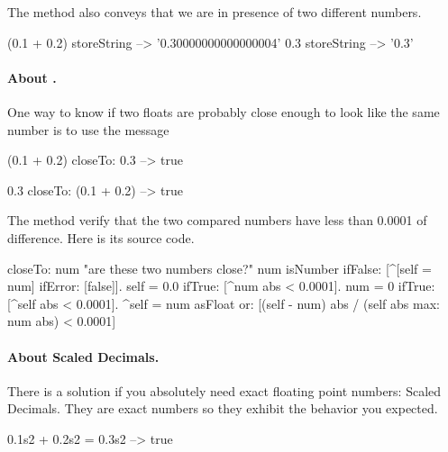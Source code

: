 \documentclass[a4paper,10pt,twoside]{book}
\begin{document}
	
The method  also conveys that we are in presence of two different numbers.
		
\begin{code}{}
(0.1 + 0.2) storeString 
	--> 	'0.30000000000000004' 
0.3 storeString 
	-->	'0.3'
\end{code}	
		
\paragraph{About .} One way to know if two floats are probably close enough to look like the same number is to use the message 

\begin{code}{}
(0.1 + 0.2) closeTo: 0.3
	--> true

0.3 closeTo: (0.1 + 0.2)
	--> true
\end{code}		

The method  verify that the two compared numbers have less than 0.0001 of difference. Here is its source code.  

\begin{code}{}
closeTo: num
 	"are these two numbers close?"
	num isNumber ifFalse: [^[self = num] ifError: [false]].
	self = 0.0 ifTrue: [^num abs < 0.0001].
	num = 0 ifTrue: [^self abs < 0.0001].
	^self = num asFloat
		or: [(self - num) abs / (self abs max: num abs) < 0.0001]	
\end{code}

		
\paragraph{About Scaled Decimals.} There is a solution if you absolutely need exact floating point numbers: Scaled Decimals. They are exact numbers so they exhibit the behavior you expected.

\begin{code}{}
0.1s2 + 0.2s2 = 0.3s2
	--> true
\end{code}		

\end{document}
